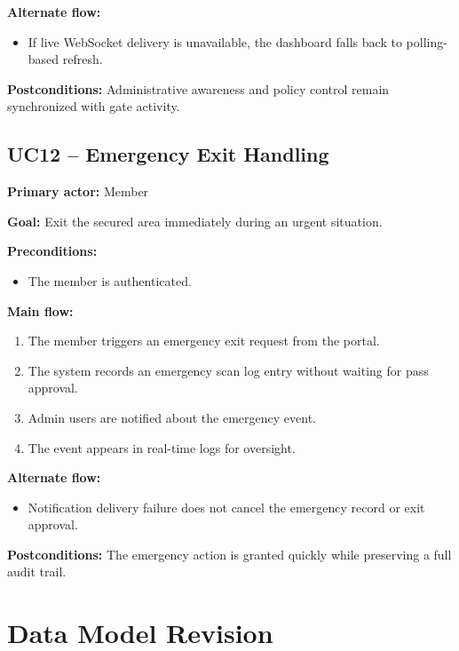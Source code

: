 \documentclass[12pt,letterpaper]{article}
\begin{document}
\textbf{Alternate flow:}
\begin{itemize}
    \item If live WebSocket delivery is unavailable, the dashboard falls back to polling-based refresh.
\end{itemize}

\textbf{Postconditions:} Administrative awareness and policy control remain synchronized with gate activity.

\subsection{UC12 -- Emergency Exit Handling}
\textbf{Primary actor:} Member

\textbf{Goal:} Exit the secured area immediately during an urgent situation.

\textbf{Preconditions:}
\begin{itemize}
    \item The member is authenticated.
\end{itemize}

\textbf{Main flow:}
\begin{enumerate}
    \item The member triggers an emergency exit request from the portal.
    \item The system records an emergency scan log entry without waiting for pass approval.
    \item Admin users are notified about the emergency event.
    \item The event appears in real-time logs for oversight.
\end{enumerate}

\textbf{Alternate flow:}
\begin{itemize}
    \item Notification delivery failure does not cancel the emergency record or exit approval.
\end{itemize}

\textbf{Postconditions:} The emergency action is granted quickly while preserving a full audit trail.

\section{Data Model Revision}
\end{document}
